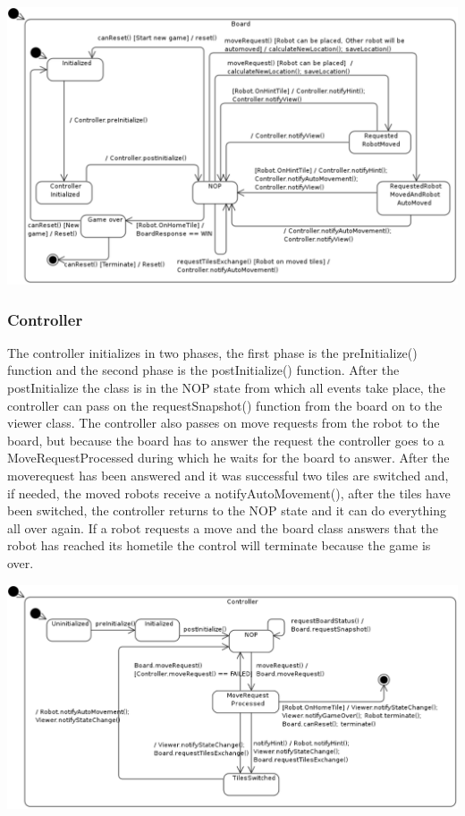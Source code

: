 	\includegraphics[width=\linewidth]{statecharts/board.pdf}

	\subsubsection{Controller}
	The controller initializes in two phases, the first phase is the preInitialize() function and the second phase is the postInitialize() function. After the postInitialize the class is in the NOP state from which all events take place, the controller can pass on the requestSnapshot() function from the board on to the viewer class. The controller also passes on move requests from the robot to the board, but because the  board has to answer the request the controller goes to a MoveRequestProcessed during which he waits for the board to answer. After the moverequest has been answered and it was successful two tiles are switched and, if needed, the moved robots receive a notifyAutoMovement(), after the tiles have been switched, the controller returns to the NOP state and it can do everything all over again. If a robot requests a move and the board class answers that the robot has reached its hometile the control will terminate because the game is over.

	\includegraphics[width=\linewidth]{statecharts/controller.pdf}

